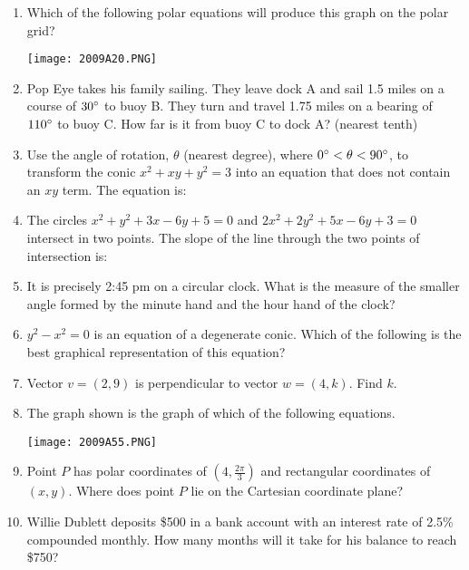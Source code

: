 \documentclass[../uilmath.tex]{subfiles}
\begin{document}
\begin{enumerate}[label=\bfseries\arabic*.]
    \item %
    Which of the following polar equations will produce this graph on the polar grid?
    \begin{center}
        \texttt{[image: 2009A20.PNG]}
    \end{center}

    \item %
    Pop Eye takes his family sailing. They leave dock A and sail 1.5 miles on a course of $30\degree$ to buoy B. They turn and travel 1.75 miles 
    on a bearing of $110\degree$ to buoy C. How far is it from buoy C to dock A? (nearest tenth)

    \item %
    Use the angle of rotation, $\theta$ (nearest degree), where $0\degree<\theta<90\degree$, to transform the conic $x^2+xy+y^2=3$ into an equation 
    that does not contain an $xy$ term. The equation is:

    \item %
    The circles $x^2+y^2+3x-6y+5=0$ and $2x^2+2y^2+5x-6y+3=0$ intersect in two points. The slope of the line through the two points of intersection is:
    
    \item %
    It is precisely 2:45 pm on a circular clock. What is the measure of the smaller angle formed by the minute hand and the hour hand of the clock?

    \item %
    $y^2-x^2=0$ is an equation of a degenerate conic. Which of the following is the best graphical representation of this equation?

    \item %
    Vector $v=(2,9)$ is perpendicular to vector $w=(4,k)$. Find $k$.

    \item %
    The graph shown is the graph of which of the following equations.
    \begin{center}
        \texttt{[image: 2009A55.PNG]}
    \end{center}

    \item %
    Point $P$ has polar coordinates of $(4,\frac{2\pi}{3})$ and rectangular coordinates of $(x,y)$. Where does point $P$ lie on the Cartesian coordinate plane?

    \item %
    Willie Dublett deposits \$500 in a bank account with an interest rate of 2.5\% compounded monthly.
    How many months will it take for his balance to reach \$750?


\end{enumerate}
\end{document}
